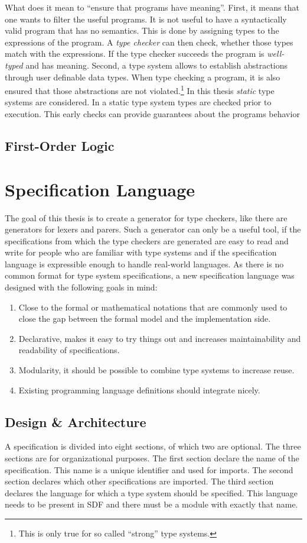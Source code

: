 \documentclass[a4paper,twoside]{report}
\begin{document}
What does it mean to ``ensure that programs have meaning''. First, it
means that one wants to filter the useful programs. It is not useful
to have a syntactically valid program that has no semantics. This is
done by assigning types to the expressions of the program. A
\textit{type checker} can then check, whether those types match with
the expressions. If the type checker succeeds the program is
\textit{well-typed} and has meaning. Second, a type system allows to
establish abstractions through user definable data types. When type
checking a program, it is also ensured that those abstractions are not
violated.\footnote{This is only true for so called ``strong'' type
  systems.} In this thesis \textit{static} type systems are
considered. In a static type system types are checked prior to
execution. This early checks can provide guarantees about the programs
behavior 
\section{First-Order Logic}


\chapter{Specification Language}
The goal of this thesis is to create a generator for type checkers,
like there are generators for lexers and parers. Such a generator can
only be a useful tool, if the specifications from which the type
checkers are generated are easy to read and write for people who are
familiar with type systems and if the specification language is
expressible enough to handle real-world languages. As there is no
common format for type system specifications, a new specification
language was designed with the following goals in mind:

\begin{enumerate}
\item Close to the formal or mathematical notations that are commonly
  used to close the gap between the formal model and the
  implementation side.
\item Declarative, makes it easy to try things out and increases
  maintainability and readability of specifications.
\item Modularity, it should be possible to combine type systems to
  increase reuse.
\item Existing programming language definitions should integrate nicely.
\end{enumerate}
\section{Design \& Architecture}
A specification is divided into eight sections, of which two are
optional. The three sections are for organizational purposes. The
first section declare the name of the specification. This name is a
unique identifier and used for imports. The second section declares
which other specifications are imported. The third section declares
the language for which a type system should be specified. This
language needs to be present in SDF and there must be a module with
exactly that name. 
\end{document}
